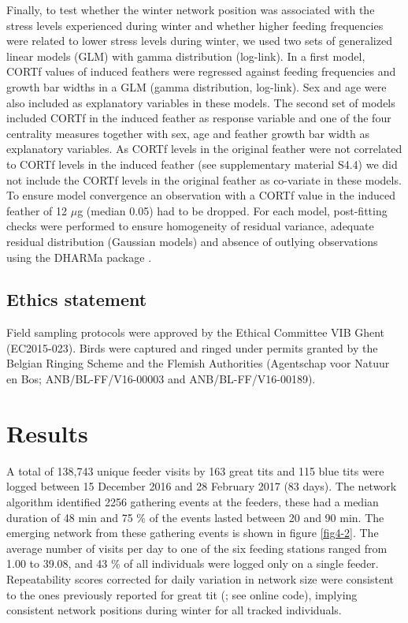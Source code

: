 \documentclass[10pt, twoside]{book} %
\begin{document}
Finally, to test whether the winter network position was associated with the stress levels experienced during winter and whether higher feeding frequencies were related to lower stress levels during winter, we used two sets of generalized linear models (GLM) with gamma distribution (log-link). In a first model, CORTf values of induced feathers were regressed against feeding frequencies and growth bar widths in a GLM (gamma distribution, log-link). Sex and age were also included as explanatory variables in these models. The second set of models included CORTf in the induced feather as response variable and one of the four centrality measures together with sex, age and feather growth bar width as explanatory variables. As CORTf levels in the original feather were not correlated to CORTf levels in the induced feather (see supplementary material S4.4) we did not include the CORTf levels in the original feather as co-variate in these models. To ensure model convergence an observation with a CORTf value in the induced feather of 12 $\mu$g (median 0.05) had to be dropped.
For each model, post-fitting checks were performed to ensure homogeneity of residual variance, adequate residual distribution (Gaussian models) and absence of outlying observations using the DHARMa package \citep{Hartig2019}. 
	

	\subsection*{Ethics statement}
	
Field sampling protocols were approved by the Ethical Committee VIB Ghent (EC2015-023). Birds were captured and ringed under permits granted by the Belgian Ringing Scheme and the Flemish Authorities (Agentschap voor Natuur en Bos; ANB/BL-FF/V16-00003 and ANB/BL-FF/V16-00189).

\clearpage
	\section{Results}
	
A total of 138,743 unique feeder visits by 163 great tits and 115 blue tits were logged between 15 December 2016 and 28 February 2017 (83 days). The network algorithm identified 2256 gathering events at the feeders, these had a median duration of 48 min and 75 \% of the events lasted between 20 and 90 min. The emerging network from these gathering events is shown in figure \ref{fig4-2}. The average number of visits per day to one of the six feeding stations ranged from 1.00 to 39.08, and 43 \% of all individuals were logged only on a single feeder. Repeatability scores corrected for daily variation in network size were consistent to the ones previously reported for great tit (\citealt{Aplin2015a}; see online code), implying consistent network positions during winter for all tracked individuals.\\
\end{document}
